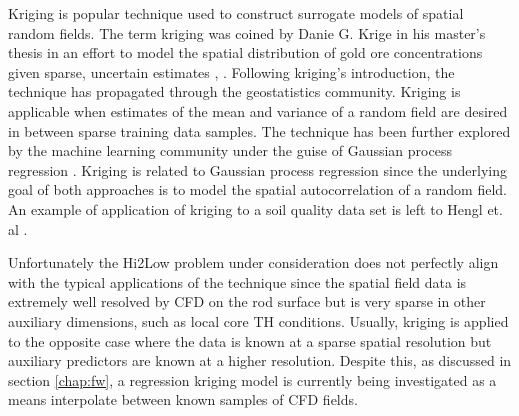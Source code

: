 Kriging is popular technique used to construct surrogate models of spatial random fields.
The term kriging was coined by Danie G. Krige in his master's thesis in an effort to model the spatial distribution of gold ore concentrations given sparse, uncertain estimates \cite{krige51}, \cite{Krige51a}. Following kriging's introduction, the technique has propagated through the geostatistics community.  Kriging is applicable when estimates of the mean and variance of a random field are desired in between sparse training data samples.  The technique has been further explored by the machine learning community under the guise of Gaussian process regression \cite{Williams96}.  Kriging is related to Gaussian process regression since the underlying goal of both approaches is to model the spatial autocorrelation of a random field.  An example of application of kriging to a soil quality data set is left to Hengl et. al \cite{Hengl07}.

Unfortunately the Hi2Low problem under consideration does not perfectly align with the typical applications of the technique since the spatial field data is extremely well resolved by CFD on the rod surface but is very sparse in other auxiliary dimensions, such as local core TH conditions.  Usually, kriging is applied to the opposite case where the data is known at a sparse spatial resolution but auxiliary predictors are known at a higher resolution.  Despite this, as discussed in section \ref{chap:fw}, a regression kriging model is currently being investigated as a means interpolate between known samples of CFD fields.

